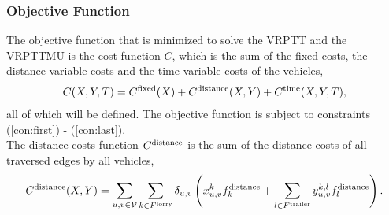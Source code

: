 \subsubsection{Objective Function}

The objective function that is minimized to solve the VRPTT and the VRPTTMU is the cost function $C$, which is the sum of the fixed costs, the distance variable costs and the time variable costs of the vehicles,
\begin{align}
   C(X,Y,T) = C^{\rm fixed}(X) + C^{\rm distance}(X,Y) + C^{\rm time}(X,Y,T),
\end{align}
all of which will be defined. The objective function is subject to constraints (\ref{con:first}) - (\ref{con:last}). \\

The distance costs function $C^{\rm distance}$ is the sum of the distance costs of all traversed edges by all vehicles,
\begin{align}
   C^{\rm distance}(X,Y) =
   \sum_{u,v \in \mathcal V}
   \sum_{k \in F^{\rm lorry}}
   \delta_{u,v}
   \left(
   x^k_{u,v}  f_k^{\rm distance}
   +
   \sum_{l \in F^{\rm trailer}}
   y^{k,l}_{u,v}  f_l^{\rm distance}
   \right) .
\end{align}


%
%
%
%
%
%
%

